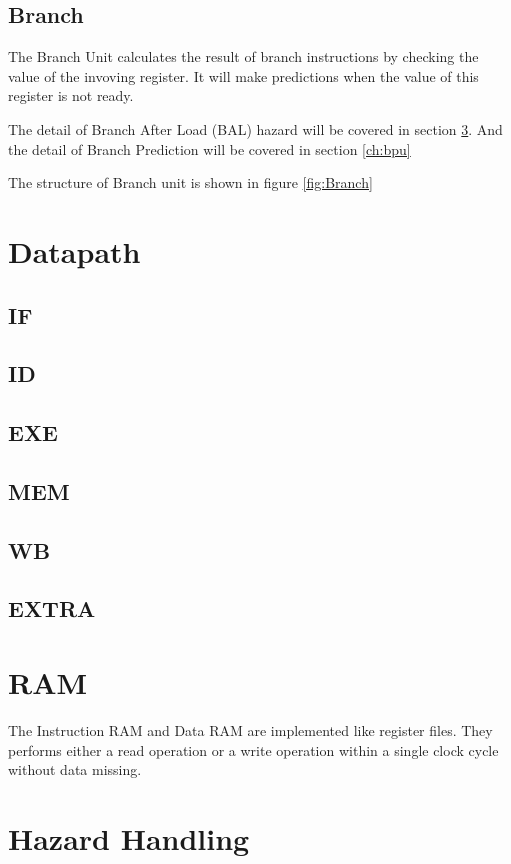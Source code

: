 \subsection[Branch]{Branch}
The Branch Unit calculates the result of branch instructions by checking the value
of the invoving register. It will make predictions when the value of this register
is not ready.

The detail of Branch After Load (BAL) hazard will be covered in section \ref{ch:hazard}. And the
detail of Branch Prediction will be covered in section \ref{ch:bpu}

The structure of Branch unit is shown in figure \ref{fig:Branch}

\section[Datapath]{Datapath}

\subsection[IF]{IF}
\subsection[ID]{ID}
\subsection[EXE]{EXE}
\subsection[MEM]{MEM}
\subsection[WB]{WB}
\subsection[EXTRA]{EXTRA}

\section[RAM]{RAM}
The Instruction RAM and Data RAM are implemented like register files. They performs
either a read operation or a write operation within a single clock cycle without
data missing.

\section[Hazard Handling]{Hazard Handling}
\label{ch:hazard}
